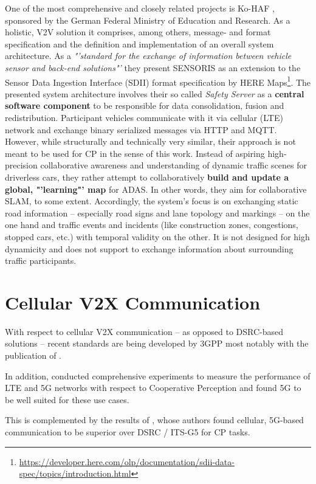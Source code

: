 One of the most comprehensive and closely related projects is Ko-HAF \cite{Hohm2019}, sponsored by the German Federal Ministry of Education and Research. As a holistic, V2V solution it comprises, among others, message- and format specification and the definition and implementation of an overall system architecture. As a \textit{"'standard for the exchange of information between vehicle sensor and back-end solutions"'} they present SENSORIS as an extension to the Sensor Data Ingestion Interface (SDII) format specification by HERE Maps\footnote{\url{https://developer.here.com/olp/documentation/sdii-data-spec/topics/introduction.html}}. The presented system architecture involves their so called \textit{Safety Server} as a \textbf{central software component} to be responsible for data consolidation, fusion and redistribution. Participant vehicles communicate with it via cellular (LTE) network and exchange binary serialized messages via HTTP and MQTT. However, while structurally and technically very similar, their approach is not meant to be used for CP in the sense of this work. Instead of aspiring high-precision collaborative awareness and understanding of dynamic traffic scenes for driverless cars, they rather attempt to collaboratively \textbf{build and update a global, "'learning"' map} for ADAS. In other words, they aim for collaborative SLAM, to some extent. Accordingly, the system's focus is on exchanging static road information – especially road signs and lane topology and markings – on the one hand and traffic events and incidents (like construction zones, congestions, stopped cars, etc.) with temporal validity on the other. It is not designed for high dynamicity and does not support to exchange information about surrounding traffic participants. 

\section{Cellular V2X Communication}
\label{sec:related_work:cellular_v2x_communication}
With respect to cellular V2X communication – as opposed to DSRC-based solutions – recent standards are being developed by 3GPP most notably with the publication of \cite{3GPP2019}.

In addition, \cite{QualcommTechnologiesInc.2018} conducted comprehensive experiments to measure the performance of LTE and 5G networks with respect to Cooperative Perception and found 5G to be well suited for these use cases. 

This is complemented by the results of \cite{5GAutomotiveAssociation2016}, whose authors found cellular, 5G-based communication to be superior over DSRC / ITS-G5 for CP tasks.

